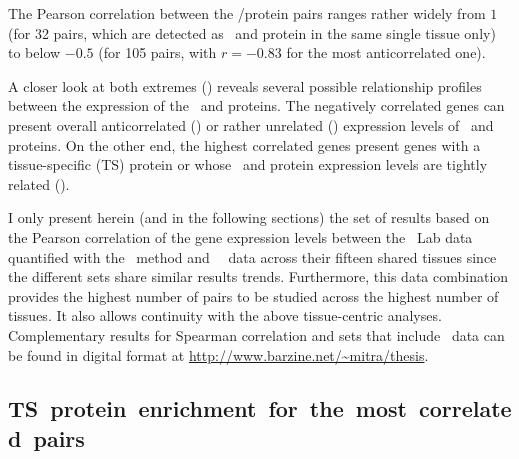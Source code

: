 The Pearson correlation between the \mRNA/protein pairs ranges rather widely
from $1$ (for 32 pairs,
which are detected as \mRNA\ and protein in the same single tissue only)
to below $-0.5$ (for 105 pairs,
with $r=-0.83$ for the  most anticorrelated one).\mybr\

A closer look at both extremes ()
reveals several possible relationship profiles
between the expression of the \mRNAs\ and proteins.
The negatively correlated genes can present
overall anticorrelated ()
or rather unrelated () expression levels
of \mRNAs\ and proteins.
On the other end,
the highest correlated genes present genes
with a tissue-specific (\gls{TS}) protein or
whose \mRNA\ and protein expression levels are tightly related
().\mybr\

I only present herein (and in the following sections)
the set of results based on the Pearson correlation of the gene expression levels
between the \pandey\ Lab data quantified with the \PPKM\ method
and \uhlen\ \etal\ data across their fifteen shared tissues
since the different sets share similar results trends.
Furthermore, this data combination provides the highest number of pairs
to be studied across the highest number of tissues.
It also allows continuity with the above tissue-centric analyses.
Complementary results
for Spearman correlation and sets that include \gtex\ data can be found
in digital format at \url{http://www.barzine.net/~mitra/thesis}.\mybr\


\subsection{TS~protein~enrichment~for~the~most~correlated~pairs}
\vspace{-5mm}

